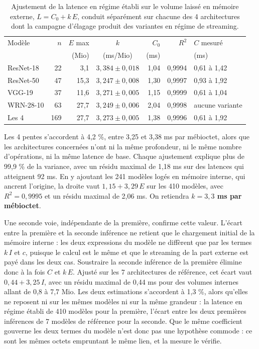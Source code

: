 \documentclass[11pt,a4paper]{report}
\begin{document}
\begin{table}[H]
\centering\small
\caption[Coefficient de transfert mesuré par architecture]{Ajustement de la latence en régime établi sur le volume laissé en mémoire externe, $L = C_0 + k\,E$, conduit séparément sur chacune des 4 architectures dont la campagne d'élagage produit des variantes en régime de streaming.}
\label{tab:kfit}
\begin{tabular}{lrrcrrl}
\toprule
Modèle & $n$ & $E$ max & $k$ & $C_0$ & $R^2$ & $C$ mesuré \\
       &     & (Mio)   & (ms/Mio) & (ms) & & (ms) \\
\midrule
ResNet-18 & 22 &  3,1 & $3{,}384 \pm 0{,}018$ & 1,04 & 0,9994 & 0,61 à 1,42 \\
ResNet-50 & 47 & 15,3 & $3{,}247 \pm 0{,}008$ & 1,30 & 0,9997 & 0,93 à 1,92 \\
VGG-19    & 37 & 11,6 & $3{,}271 \pm 0{,}005$ & 1,15 & 0,9999 & 0,61 à 1,04 \\
WRN-28-10 & 63 & 27,7 & $3{,}249 \pm 0{,}006$ & 2,04 & 0,9998 & aucune variante \\
\midrule
Les 4 & 169 & 27,7 & $3{,}273 \pm 0{,}005$ & 1,38 & 0,9996 & 0,61 à 1,92 \\
\bottomrule
\end{tabular}
\end{table}

Les 4 pentes s'accordent à 4,2 \%, entre 3,25 et 3,38 ms par mébioctet, alors que les architectures concernées n'ont ni la même profondeur, ni le même nombre d'opérations, ni la même latence de base. Chaque ajustement explique plus de 99,9 \% de la variance, avec un résidu maximal de 1,18 ms sur des latences qui atteignent 92 ms. En y ajoutant les 241 modèles logés en mémoire interne, qui ancrent l'origine, la droite vaut $1{,}15 + 3{,}29\,E$ sur les 410 modèles, avec $R^2 = 0{,}9995$ et un résidu maximal de 2,06 ms. On retiendra \textbf{\boldmath$k = 3{,}3$ ms par mébioctet}.

Une seconde voie, indépendante de la première, confirme cette valeur. L'écart entre la première et la seconde inférence ne retient que le chargement initial de la mémoire interne : les deux expressions du modèle ne diffèrent que par les termes $k\,I$ et $c$, puisque le calcul est le même et que le streaming de la part externe est payé dans les deux cas. Soustraire la seconde inférence de la première élimine donc à la fois $C$ et $k\,E$. Ajusté sur les 7 architectures de référence, cet écart vaut $0{,}44 + 3{,}25\,I$, avec un résidu maximal de 0,44 ms pour des volumes internes allant de 0,8 à 7,7 Mio. Les deux estimations s'accordent à 1,3 \%, alors qu'elles ne reposent ni sur les mêmes modèles ni sur la même grandeur : la latence en régime établi de 410 modèles pour la première, l'écart entre les deux premières inférences de 7 modèles de référence pour la seconde. Que le même coefficient gouverne les deux termes du modèle n'est donc pas une hypothèse commode : ce sont les mêmes octets empruntant le même lien, et la mesure le vérifie.
\end{document}
